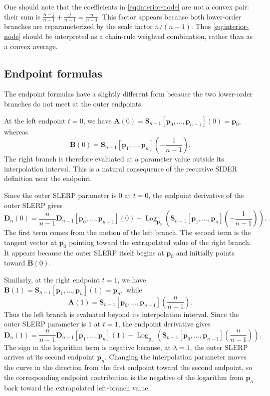 \documentclass[a4paper,11pt]{article}
\newcommand{\bp}{\mathbf{p}}
\newcommand{\bA}{\mathbf{A}}
\newcommand{\bB}{\mathbf{B}}
\newcommand{\bD}{\mathbf{D}}
\newcommand{\Log}{\operatorname{Log}}
\numberwithin{equation}{section}
\theoremstyle{plain}
\theoremstyle{definition}
\theoremstyle{remark}
\begin{document}
One should note that the coefficients in \eqref{eq:interior-node} are not a convex pair: their sum is
\(\frac{n-j}{n-1}+\frac{j}{n-1} = \frac{n}{n-1}.\)
This factor appears because both lower-order branches are reparameterized by the scale factor $n/(n-1)$.  Thus \eqref{eq:interior-node} should be interpreted as a chain-rule weighted combination, rather than as a convex average.

\subsection{Endpoint formulas}

The endpoint formulas have a slightly different form because the two lower-order branches do not meet at the outer endpoints.

At the left endpoint $t=0$, we have
\(\bA(0) = \mathbf{S}_{n-1}[\bp_0,\ldots,\bp_{n-1}](0) = \bp_0,\)
whereas
\[
        \bB(0)
        =
        \mathbf{S}_{n-1}[\bp_1,\ldots,\bp_n]
        \!\left(-\frac{1}{n-1}\right).
\]
The right branch is therefore evaluated at a parameter value outside its interpolation interval.  This is a natural consequence of the recursive SIDER definition near the endpoint.

Since the outer SLERP parameter is $0$ at $t=0$, the endpoint derivative of the outer SLERP gives
\begin{equation}
\label{eq:left-endpoint}
\boxed{
        \bD_n(0)
        =
        \frac{n}{n-1}
        \bD_{n-1}[\bp_0,\ldots,\bp_{n-1}](0)
        +
        \Log_{\bp_0}
        \left(
        \mathbf{S}_{n-1}[\bp_1,\ldots,\bp_n]
        \!\left(-\frac{1}{n-1}\right)
        \right).
}
\end{equation}
The first term comes from the motion of the left branch.  The second term is the tangent vector at $\bp_0$ pointing toward the extrapolated value of the right branch.  It appears because the outer SLERP itself begins at $\bp_0$ and initially points toward $\bB(0)$.

Similarly, at the right endpoint $t=1$, we have
\(\bB(1) = \mathbf{S}_{n-1}[\bp_1,\ldots,\bp_n](1) = \bp_n,\)
while
\[
        \bA(1)
        =
        \mathbf{S}_{n-1}[\bp_0,\ldots,\bp_{n-1}]
        \!\left(\frac{n}{n-1}\right).
\]
Thus the left branch is evaluated beyond its interpolation interval.  Since the outer SLERP parameter is $1$ at $t=1$, the endpoint derivative gives
\begin{equation}
\label{eq:right-endpoint}
\boxed{
        \bD_n(1)
        =
        \frac{n}{n-1}
        \bD_{n-1}[\bp_1,\ldots,\bp_n](1)
        -
        \Log_{\bp_n}
        \left(
        \mathbf{S}_{n-1}[\bp_0,\ldots,\bp_{n-1}]
        \!\left(\frac{n}{n-1}\right)
        \right).
}
\end{equation}
The sign in the logarithm term is negative because, at $\lambda=1$, the outer SLERP arrives at its second endpoint $\bp_n$.  Changing the interpolation parameter moves the curve in the direction from the first endpoint toward the second endpoint, so the corresponding endpoint contribution is the negative of the logarithm from $\bp_n$ back toward the extrapolated left-branch value.
\end{document}
